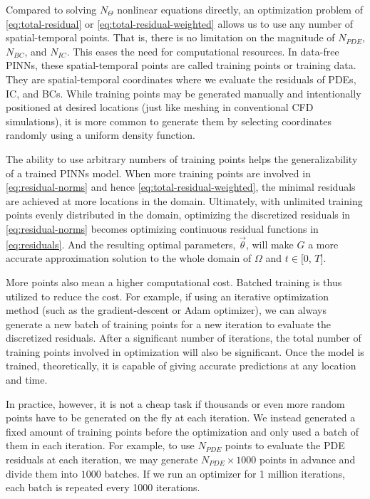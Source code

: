 
Compared to solving $N_\Theta$ nonlinear equations directly, an optimization problem of \eqref{eq:total-residual} or \eqref{eq:total-residual-weighted} allows us to use any number of spatial-temporal points.
That is, there is no limitation on the magnitude of $N_{PDE}$, $N_{BC}$, and $N_{IC}$.
This eases the need for computational resources.
In data-free PINNs, these spatial-temporal points are called training points or training data.
They are spatial-temporal coordinates where we evaluate the residuals of PDEs, IC, and BCs.
While training points may be generated manually and intentionally positioned at desired locations (just like meshing in conventional CFD simulations), it is more common to generate them by selecting coordinates randomly using a uniform density function. 

The ability to use arbitrary numbers of training points helps the generalizability of a trained PINNs model.
When more training points are involved in \eqref{eq:residual-norms} and hence \eqref{eq:total-residual-weighted}, the minimal residuals are achieved at more locations in the domain. 
Ultimately, with unlimited training points evenly distributed in the domain, optimizing the discretized residuals in \eqref{eq:residual-norms} becomes optimizing continuous residual functions in \eqref{eq:residuals}. 
And the resulting optimal parameters, $\vec{\theta}$, will make $G$ a more accurate approximation solution to the whole domain of $\Omega$ and $t\in[0$, $T]$.

More points also mean a higher computational cost.
Batched training is thus utilized to reduce the cost.
For example, if using an iterative optimization method (such as the gradient-descent or Adam optimizer), we can always generate a new batch of training points for a new iteration to evaluate the discretized residuals.
After a significant number of iterations, the total number of training points involved in optimization will also be significant.
Once the model is trained, theoretically, it is capable of giving accurate predictions at any location and time.

In practice, however, it is not a cheap task if thousands or even more random points have to be generated on the fly at each iteration.
We instead generated a fixed amount of training points before the optimization and only used a batch of them in each iteration.
For example, to use $N_{PDE}$ points to evaluate the PDE residuals at each iteration, we may generate $N_{PDE}\times 1000$ points in advance and divide them into $1000$ batches.
If we run an optimizer for 1 million iterations, each batch is repeated every 1000 iterations.

